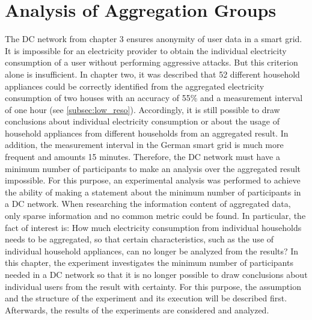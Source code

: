 \chapter{Analysis of Aggregation Groups}
\label{sec:experiments}


The DC network from chapter 3 ensures anonymity of user data in a smart grid. It is impossible for an electricity provider to obtain the individual electricity consumption of a user without performing aggressive attacks. But this criterion alone is insufficient. In chapter two, it was described that 52 different household appliances could be correctly identified from the aggregated electricity consumption of two houses with an accuracy of 55\% and a measurement interval of one hour (see \ref{subsec:low_reso}). Accordingly, it is still possible to draw conclusions about individual electricity consumption or about the usage of household appliances from different households from an aggregated result. In addition, the measurement interval in the German smart grid is much more frequent and amounts 15 minutes. Therefore, the DC network must have a minimum number of participants to make an analysis over the aggregated result impossible. For this purpose, an experimental analysis was performed to achieve the ability of making a statement about the minimum number of participants in a DC network. When researching the information content of aggregated data, only sparse information and no common metric could be found. In particular, the fact of interest is: How much electricity consumption from individual households needs to be aggregated, so that certain characteristics, such as the use of individual household appliances, can no longer be analyzed from the results? In this chapter, the experiment investigates the minimum number of participants needed in a DC network so that it is no longer possible to draw conclusions about individual users from the result with certainty. For this purpose, the assumption and the structure of the experiment and its execution will be described first. Afterwards, the results of the experiments are considered and analyzed.
